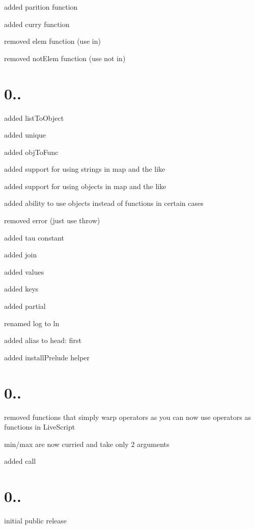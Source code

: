 \begin{DoxyItemize}
\item added {\ttfamily parition} function
\item added {\ttfamily curry} function
\item removed {\ttfamily elem} function (use {\ttfamily in})
\item removed {\ttfamily not\+Elem} function (use {\ttfamily not in})
\end{DoxyItemize}

\section*{0..}


\begin{DoxyItemize}
\item added {\ttfamily list\+To\+Object}
\item added {\ttfamily unique}
\item added {\ttfamily obj\+To\+Func}
\item added support for using strings in map and the like
\item added support for using objects in map and the like
\item added ability to use objects instead of functions in certain cases
\item removed {\ttfamily error} (just use throw)
\item added {\ttfamily tau} constant
\item added {\ttfamily join}
\item added {\ttfamily values}
\item added {\ttfamily keys}
\item added {\ttfamily partial}
\item renamed {\ttfamily log} to {\ttfamily ln}
\item added alias to {\ttfamily head}\+: {\ttfamily first}
\item added {\ttfamily install\+Prelude} helper
\end{DoxyItemize}

\section*{0..}


\begin{DoxyItemize}
\item removed functions that simply warp operators as you can now use operators as functions in Live\+Script
\item {\ttfamily min/max} are now curried and take only 2 arguments
\item added {\ttfamily call}
\end{DoxyItemize}

\section*{0..}


\begin{DoxyItemize}
\item initial public release 
\end{DoxyItemize}